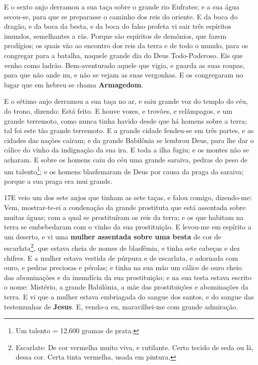 E o sexto anjo derramou a sua taça sobre o grande rio Eufrates; e
a sua água secou-se, para que se preparasse o caminho dos reis do
oriente. E da boca do dragão, e da boca da besta, e da boca
do falso profeta vi sair três espíritos imundos, semelhantes a rãs.
Porque são espíritos de demônios, que fazem prodígios; os
quais vão ao encontro dos reis da terra e de todo o mundo, para os
congregar para a batalha, naquele grande dia do Deus Todo-Poderoso.
Eis que venho como ladrão. Bem-aventurado aquele que vigia, e
guarda as suas roupas, para que não ande nu, e não se vejam as suas
vergonhas. E os congregaram no lugar que em hebreu se chama
\textbf{Armagedom}.

E o sétimo anjo derramou a sua taça no ar, e saiu grande voz do
templo do céu, do trono, dizendo: Está feito. E houve vozes,
e trovões, e relâmpagos, e um grande terremoto, como nunca tinha
havido desde que há homens sobre a terra; tal foi este tão grande
terremoto. E a grande cidade fendeu-se em três partes, e as
cidades das nações caíram; e da grande Babilônia se lembrou Deus,
para lhe dar o cálice do vinho da indignação da sua ira. E
toda a ilha fugiu; e os montes não se acharam. E sobre os
homens caiu do céu uma grande saraiva, pedras do peso de um
talento\footnote{Um talento = 12.600 gramas de prata.}; e os homens
blasfemaram de Deus por causa da praga da saraiva; porque a sua
praga era mui grande.

\medskip

\lettrine{17} E veio um dos sete anjos que tinham as sete
taças, e falou comigo, dizendo-me: Vem, mostrar-te-ei a condenação
da grande prostituta que está assentada sobre muitas águas; com
a qual se prostituíram os reis da terra; e os que habitam na terra
se embebedaram com o vinho da sua prostituição. E levou-me em
espírito a um deserto, e vi uma \textbf{mulher assentada sobre uma
besta} de cor de escarlata\footnote{Escarlate: De cor vermelha muito
viva, e rutilante. Certo tecido de seda ou lã, dessa cor. Certa
tinta vermelha, usada em pintura.}, que estava cheia de nomes de
blasfêmia, e tinha sete cabeças e dez chifres. E a mulher estava
vestida de púrpura e de escarlata, e adornada com ouro, e pedras
preciosas e pérolas; e tinha na sua mão um cálice de ouro cheio das
abominações e da imundícia da sua prostituição; e na sua testa
estava escrito o nome: Mistério, a grande Babilônia, a mãe das
prostituições e abominações da terra. E vi que a mulher estava
embriagada do sangue dos santos, e do sangue das testemunhas de
\textbf{Jesus}. E, vendo-a eu, maravilhei-me com grande admiração.

